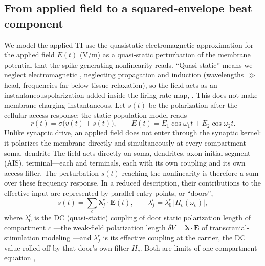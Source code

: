 \documentclass[11pt,a4paper]{article}
\newcommand{\Sig}{\sigma}
\providecommand{\DIFaddtex}[1]{{\protect\color{blue} \sf #1}} %
\providecommand{\DIFdeltex}[1]{{\protect\color{red} \scriptsize #1}} %
\providecommand{\DIFaddbegin}{} %
\providecommand{\DIFaddend}{} %
\providecommand{\DIFdelbegin}{} %
\providecommand{\DIFdelend}{} %
\providecommand{\DIFadd}[1]{\texorpdfstring{\DIFaddtex{#1}}{#1}} %
\providecommand{\DIFdel}[1]{\texorpdfstring{\DIFdeltex{#1}}{}} %
\begin{document}
\subsection{From applied field to a squared-envelope beat component}\label{sec:coupling}
We \DIFdelbegin \DIFdel{model the applied TI }\DIFdelend \DIFaddbegin \DIFadd{use the quasistatic electromagnetic approximation for the applied }\DIFaddend field $E(t)$
(V/m)\DIFdelbegin \DIFdel{as a quasi-static perturbation of the
membrane potential that the spike-generating nonlinearity reads. ``Quasi-static''
means we neglect electromagnetic }\DIFdelend \DIFaddbegin \DIFadd{, neglecting }\DIFaddend propagation and induction\DIFdelbegin \DIFdel{(wavelengths $\gg$
head, frequencies far below tissue relaxation), so the field acts as an
instantaneouspolarization added inside the firing-rate map,
}\DIFdelend \DIFaddbegin \DIFadd{. This does not make membrane charging
instantaneous. Let $s(t)$ be the polarization after the cellular access response;
the static population model reads
}\DIFaddend \begin{equation}
r(t)=\Sig\!\big(v(t)+s(t)\big),\qquad
E(t)=E_1\cos\omega_1 t+E_2\cos\omega_2 t .
\label{eq:coupling}
\end{equation}
\DIFdelbegin \DIFdel{Unlike synaptic drive, an applied field does not enter through the synaptic kernel:
it polarizes the membrane directly and simultaneously at every compartment---soma, dendrite}\DIFdelend \DIFaddbegin \DIFadd{The field acts directly on soma, dendrites}\DIFaddend , axon initial segment (AIS), \DIFdelbegin \DIFdel{terminal---each }\DIFdelend \DIFaddbegin \DIFadd{and terminals,
each }\DIFaddend with its own coupling and \DIFdelbegin \DIFdel{its
own access filter. The perturbation $s(t)$ reaching the nonlinearity is therefore a sum over these }\DIFdelend \DIFaddbegin \DIFadd{frequency response. In a reduced description, their
contributions to the effective input are represented by }\DIFaddend parallel entry points,
\DIFdelbegin \DIFdel{or ``doors'',
}\DIFdelend \begin{equation}
s(t)=\sum_c \boldsymbol\lambda^c_f\!\cdot\!\mathbf E(t),\qquad
\lambda^c_f=\lambda^c_0\,\lvert H_c(\omega_c)\rvert,
\label{eq:doors}
\end{equation}
where $\lambda^c_0$ is the \DIFdelbegin \DIFdel{DC (quasi-static) coupling of door }\DIFdelend \DIFaddbegin \DIFadd{static polarization length of compartment }\DIFaddend $c$\DIFdelbegin \DIFdel{---the weak-field
polarization length $\delta V=\boldsymbol\lambda\!\cdot\!\mathbf E$ of transcranial-stimulation modeling \cite{ruffini2025rosetta,galangadea2023}---and $\lambda^c_f$ is its effective coupling at the carrier, the DC value rolled off by that door's own filter
$H_c$. Both are limits of one compartment equation }\DIFdelend ,
\end{document}
